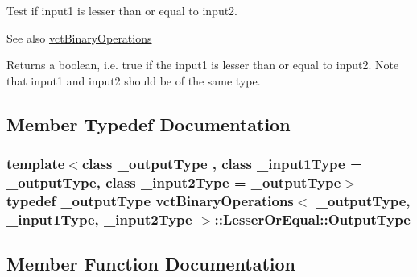 Test if input1 is lesser than or equal to input2. 

\begin{DoxySeeAlso}{See also}
\hyperlink{classvct_binary_operations}{vct\+Binary\+Operations}
\end{DoxySeeAlso}
Returns a boolean, i.\+e. true if the input1 is lesser than or equal to input2. Note that input1 and input2 should be of the same type. 

\subsection{Member Typedef Documentation}
\hypertarget{classvct_binary_operations_1_1_lesser_or_equal_adff9c45eb56546ff372f5b7a614bb271}{}
\subsubsection[{Output\+Type}]{\setlength{\rightskip}{0pt plus 5cm}template$<$class \+\_\+output\+Type , class \+\_\+input1\+Type  = \+\_\+output\+Type, class \+\_\+input2\+Type  = \+\_\+output\+Type$>$ typedef \+\_\+output\+Type {\bf vct\+Binary\+Operations}$<$ \+\_\+output\+Type, \+\_\+input1\+Type, \+\_\+input2\+Type $>$\+::{\bf Lesser\+Or\+Equal\+::\+Output\+Type}}\label{classvct_binary_operations_1_1_lesser_or_equal_adff9c45eb56546ff372f5b7a614bb271}


\subsection{Member Function Documentation}
\hypertarget{classvct_binary_operations_1_1_lesser_or_equal_a1fbc00f49c2eaeaf287edd8c3537f5e3}{}
